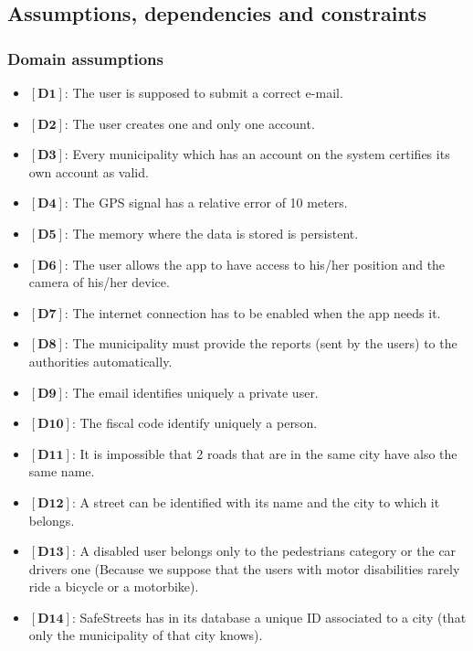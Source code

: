 \documentclass[titlepage]{article}
\begin{document}
 



\subsection{Assumptions, dependencies and constraints}
\subsubsection{Domain assumptions }
\begin{itemize}
	\item $[\textbf{D1}]$: The user is supposed to submit a correct e-mail.
	\item $[\textbf{D2}]$: The user creates one and only one account.
	\item $[\textbf{D3}]$: Every municipality which has an account on the system certifies its own account as valid.
	\item $[\textbf{D4}]$: The GPS signal has a relative error of 10 meters.
	\item $[\textbf{D5}]$: The memory where the data is stored is persistent.
	\item$[\textbf{D6}]$: The user allows the app to have access to his/her position and the camera of his/her device.
	\item $[\textbf{D7}]$: The internet connection has to be enabled when the app needs it.
	\item $[\textbf{D8}]$: The municipality must provide the reports (sent by the users) to the authorities automatically.
	\item $[\textbf{D9}]$: The email identifies uniquely a private user.
	\item $[\textbf{D10}]$: The fiscal code identify uniquely a person.
	\item $[\textbf{D11}]$: It is impossible that 2 roads that are in the same city have also the same name.
	\item $[\textbf{D12}]$: A street can be identified with its name and the city to which it belongs.
	\item $[\textbf{D13}]$: A disabled user belongs only to the pedestrians category or the car drivers one (Because we suppose that the users with motor disabilities rarely ride a bicycle or a motorbike).
	\item $[\textbf{D14}]$: SafeStreets has in its database a unique ID associated to a city (that only the municipality of that city knows).
	
\end{itemize}
\end{document}
